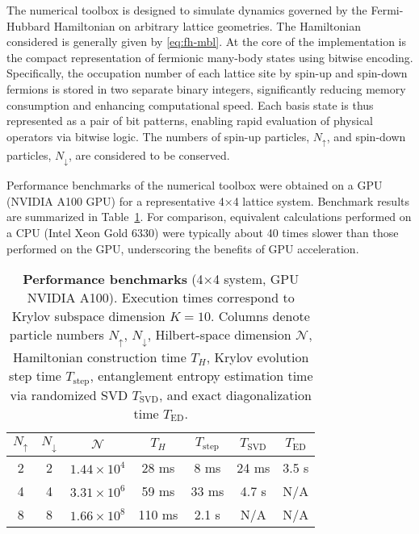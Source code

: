 
The numerical toolbox is designed to simulate dynamics governed by the Fermi-Hubbard Hamiltonian on arbitrary lattice geometries. The Hamiltonian considered is generally given by \eqref{eq:fh-mbl}. At the core of the implementation is the compact representation of fermionic many-body states using bitwise encoding. Specifically, the occupation number of each lattice site by spin-up and spin-down fermions is stored in two separate binary integers, significantly reducing memory consumption and enhancing computational speed. Each basis state is thus represented as a pair of bit patterns, enabling rapid evaluation of physical operators via bitwise logic. The numbers of spin-up particles, $N_\uparrow$, and spin-down particles, $N_\downarrow$, are considered to be conserved.


Performance benchmarks of the numerical toolbox were obtained on a GPU (NVIDIA A100 GPU) for a representative 4×4 lattice system. Benchmark results are summarized in Table~\ref{tab:performance}. For comparison, equivalent calculations performed on a CPU (Intel Xeon Gold 6330) were typically about 40 times slower than those performed on the GPU, underscoring the benefits of GPU acceleration.

\begin{table}
\centering
\caption{
\textbf{Performance benchmarks} (4×4 system, GPU NVIDIA A100).
Execution times correspond to Krylov subspace dimension $K=10$. Columns denote particle numbers $N_\uparrow$, $N_\downarrow$, Hilbert-space dimension $\mathcal{N}$, Hamiltonian construction time $T_H$, Krylov evolution step time $T_{\mathrm{step}}$, entanglement entropy estimation time via randomized SVD $T_{\mathrm{SVD}}$, and exact diagonalization time $T_{\mathrm{ED}}$.
}
\begin{tabular}{ccccccc}
\toprule
$N_\uparrow$ & $N_\downarrow$ & $\mathcal{N}$ & $T_H$ & $T_{\mathrm{step}}$ & $T_{\mathrm{SVD}}$ & $T_{\mathrm{ED}}$ \\
\midrule
2 & 2 & $1.44\times10^4$ & 28 ms & 8 ms & 24 ms & 3.5 s \\
4 & 4 & $3.31\times10^6$ & 59 ms & 33 ms & 4.7 s & N/A \\
8 & 8 & $1.66\times10^8$ & 110 ms & 2.1 s & N/A & N/A \\
\bottomrule
\end{tabular}
\label{tab:performance}
\end{table}

